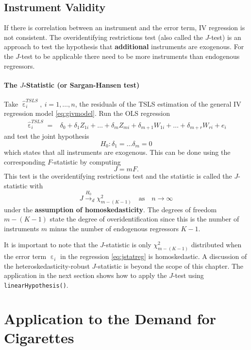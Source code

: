 \documentclass[
  14pt,
]{memoir}
\DeclareMathOperator{\eps}{\varepsilon}
\begin{document}
\hypertarget{instrument-validity}{%
\subsection{Instrument Validity}\label{instrument-validity}}

If there is correlation between an instrument and the error term, IV regression is not consistent. The overidentifying restrictions test (also called the \(J\)-test) is an approach to test the hypothesis that \textbf{additional} instruments are exogenous. For the \(J\)-test to be applicable there need to be more instruments than endogenous regressors.

\paragraph*{The $J$-Statistic (or Sargan-Hansen test)}

Take \(\hat{\eps}_i^{TSLS},\ i = 1,\dots,n\), the residuals of the TSLS estimation of the general IV regression model \eqref{eq:givmodel}. Run the OLS regression
\begin{align}
\hat{\eps}_i^{TSLS} =& \delta_0 + \delta_1 Z_{1i} + \dots + \delta_m Z_{mi} + \delta_{m+1} W_{1i} + \dots + \delta_{m+r} W_{ri} + e_i \label{eq:jstatreg}
\end{align}
and test the joint hypothesis
\[
H_0: \delta_1 = \dots \delta_{m} = 0
\]
which states that all instruments are exogenous. This can be done using the corresponding \(F\)-statistic by computing
\[
J = m  F.
\]
This test is the overidentifying restrictions test and the statistic is called the \(J\)-statistic with
\[
J \overset{H_0}{\to}_d \chi^2_{m-(K-1)}\quad\text{as}\quad n\to\infty
\]
under the \textbf{assumption of homoskedasticity}. The degrees of freedom \(m-(K-1)\) state the degree of overidentification since this is the number of instruments \(m\) minus the number of endogenous regressors \(K-1\).

It is important to note that the \(J\)-statistic is only \(\chi^2_{m-(K-1)}\) distributed when the error term \(\eps_i\) in the regression \eqref{eq:jstatreg} is homoskedastic. A discussion of the heteroskedasticity-robust \(J\)-statistic is beyond the scope of this chapter. The application in the next section shows how to apply the \(J\)-test using \texttt{linearHypothesis()}.

\hypertarget{attdfc}{%
\section{Application to the Demand for Cigarettes}\label{attdfc}}
\end{document}
